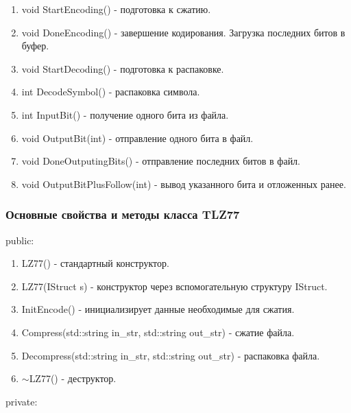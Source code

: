 \documentclass[12pt]{article}
\begin{document}
\begin{enumerate}
	\item void StartEncoding() - подготовка к сжатию.
	\item void DoneEncoding() - завершение кодирования. Загрузка последних битов в буфер.
	\item void StartDecoding() - подготовка к распаковке.
	\item int DecodeSymbol() - распаковка символа.
	\item int InputBit() - получение одного бита из файла.
	\item void OutputBit(int) - отправление одного бита в файл.
	\item void DoneOutputingBits() - отправление последних битов в файл.
	\item void OutputBitPlusFollow(int) - вывод указанного бита и отложенных ранее.
\end{enumerate}

\subsubsection*{Основные свойства и методы класса TLZ77}
\noindent
public:

\begin{enumerate}
	\item LZ77() - стандартный конструктор.
	\item LZ77(IStruct s) - конструктор через вспомогательную структуру IStruct.
	\item InitEncode() - инициализирует данные необходимые для сжатия.
	\item Compress(std::string in\_str, std::string out\_str) - сжатие файла. 
	\item Decompress(std::string in\_str, std::string out\_str) -  распаковка файла.
	\item $\sim$LZ77() - деструктор.
\end{enumerate}
\noindent
private:
\end{document}
